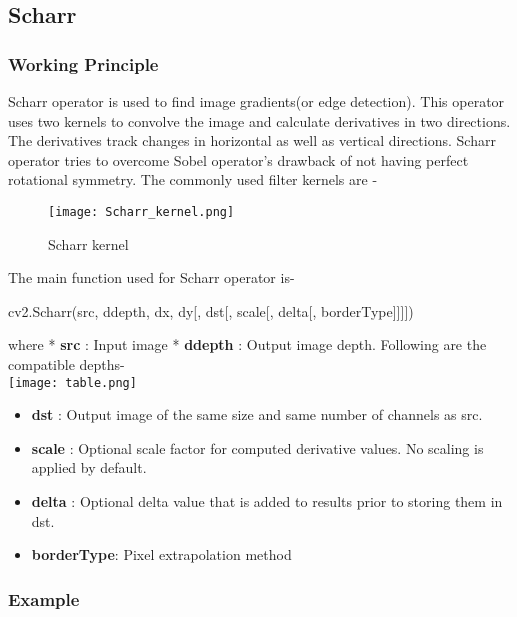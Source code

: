 \documentclass[]{article}
\newenvironment{Shaded}{}{}
\newcommand{\NormalTok}[1]{{#1}}
\providecommand{\tightlist}{%
  \setlength{\itemsep}{0pt}\setlength{\parskip}{0pt}}
\begin{document}
\subsection{Scharr}\label{scharr}

\subsubsection{Working Principle}\label{working-principle}

Scharr operator is used to find image gradients(or edge detection). This
operator uses two kernels to convolve the image and calculate
derivatives in two directions. The derivatives track changes in
horizontal as well as vertical directions. Scharr operator tries to
overcome Sobel operator's drawback of not having perfect rotational
symmetry. The commonly used filter kernels are -

\begin{figure}[htbp]
\centering
\texttt{[image: Scharr\_kernel.png]}
\caption{Scharr kernel}
\end{figure}

The main function used for Scharr operator is-

\begin{Shaded}
\begin{Highlighting}[]
    \NormalTok{cv2.Scharr(src, ddepth, dx, dy[, dst[, scale[, delta[, borderType]]]])}
\end{Highlighting}
\end{Shaded}

where * \textbf{src} : Input image * \textbf{ddepth} : Output image
depth. Following are the compatible depths- \\
\texttt{[image: table.png]}

\begin{itemize}
\tightlist
\item
  \textbf{dst} : Output image of the same size and same number of
  channels as src.
\item
  \textbf{scale} : Optional scale factor for computed derivative values.
  No scaling is applied by default.
\item
  \textbf{delta} : Optional delta value that is added to results prior
  to storing them in dst.
\item
  \textbf{borderType}: Pixel extrapolation method
\end{itemize}

\subsubsection{Example}\label{example}
\end{document}
